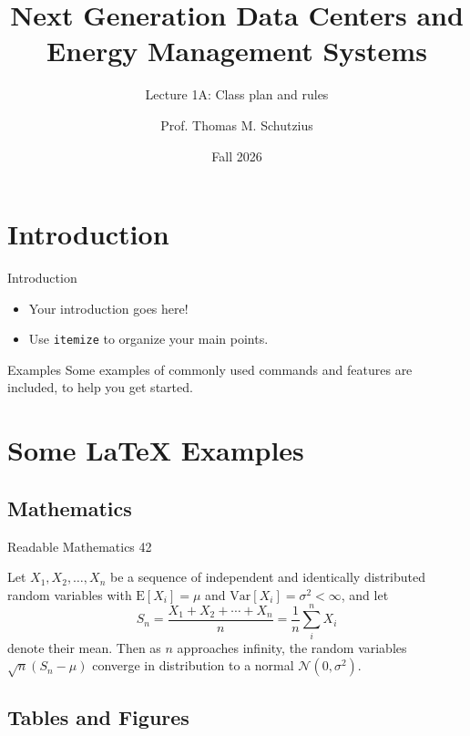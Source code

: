 \documentclass[10pt,xcolor={table,dvipsnames},t]{beamer}
\title[lecture 01]{Next Generation Data Centers and Energy Management Systems}
\subtitle{Lecture 1A: Class plan and rules}
\author{Prof. Thomas M. Schutzius}
\institute{Department of Mechanical Engineering}
\date{Fall 2026}
\begin{document}
\begin{frame}
  \titlepage
\end{frame}


\section{Introduction}

\begin{frame}{Introduction}

\begin{itemize}
  \item Your introduction goes here!
  \item Use \texttt{itemize} to organize your main points.
\end{itemize}

\begin{block}{Examples}
Some examples of commonly used commands and features are included, to help you get started.
\end{block}

\end{frame}

\section{Some \LaTeX{} Examples}

\subsection{Mathematics}

\begin{frame}{Readable Mathematics 42}

Let $X_1, X_2, \ldots, X_n$ be a sequence of independent and identically distributed random variables with $\text{E}[X_i] = \mu$ and $\text{Var}[X_i] = \sigma^2 < \infty$, and let
$$S_n = \frac{X_1 + X_2 + \cdots + X_n}{n}
      = \frac{1}{n}\sum_{i}^{n} X_i$$
denote their mean. Then as $n$ approaches infinity, the random variables $\sqrt{n}(S_n - \mu)$ converge in distribution to a normal $\mathcal{N}(0, \sigma^2)$.

\end{frame}


\subsection{Tables and Figures}
\end{document}
